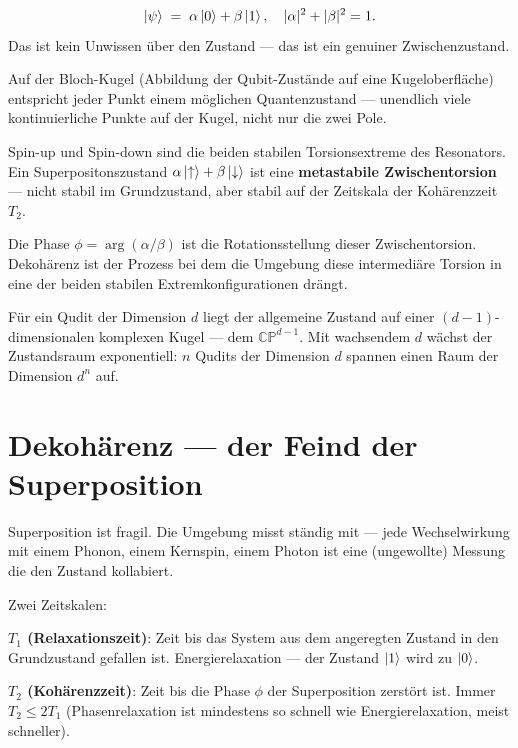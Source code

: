 \begin{equation}
  \left|\psi\right\rangle \;=\; \alpha\left|0\right\rangle + \beta\left|1\right\rangle,
  \quad |\alpha|^2 + |\beta|^2 = 1.
\end{equation}
Das ist kein Unwissen über den Zustand ---
das ist ein genuiner Zwischenzustand.

Auf der Bloch-Kugel (Abbildung der Qubit-Zustände
auf eine Kugeloberfläche) entspricht jeder Punkt
einem möglichen Quantenzustand ---
unendlich viele kontinuierliche Punkte auf der Kugel,
nicht nur die zwei Pole.

\begin{foundation}
Spin-up und Spin-down sind die beiden stabilen
Torsionsextreme des Resonators.
Ein Superpositonszustand $\alpha\left|\uparrow\right\rangle+\beta\left|\downarrow\right\rangle$
ist eine \textbf{metastabile Zwischentorsion} ---
nicht stabil im Grundzustand, aber stabil auf
der Zeitskala der Kohärenzzeit $T_2$.

Die Phase $\phi = \arg(\alpha/\beta)$ ist die
Rotationsstellung dieser Zwischentorsion.
Dekohärenz ist der Prozess bei dem die Umgebung
diese intermediäre Torsion in eine der beiden
stabilen Extremkonfigurationen drängt.
\end{foundation}

Für ein Qudit der Dimension $d$ liegt der
allgemeine Zustand auf einer $(d-1)$-dimensionalen
komplexen Kugel --- dem \textbf{$\mathbb{CP}^{d-1}$}.
Mit wachsendem $d$ wächst der Zustandsraum
exponentiell: $n$ Qudits der Dimension $d$
spannen einen Raum der Dimension $d^n$ auf.

\section{Dekohärenz --- der Feind der Superposition}
\label{sec:dekohärenz}

Superposition ist fragil. Die Umgebung misst ständig
mit --- jede Wechselwirkung mit einem Phonon,
einem Kernspin, einem Photon ist eine
(ungewollte) Messung die den Zustand kollabiert.

Zwei Zeitskalen:

\textbf{$T_1$ (Relaxationszeit)}: Zeit bis das System
aus dem angeregten Zustand in den Grundzustand gefallen ist.
Energierelaxation --- der Zustand $\left|1\right\rangle$ wird zu $\left|0\right\rangle$.

\textbf{$T_2$ (Kohärenzzeit)}: Zeit bis die Phase $\phi$
der Superposition zerstört ist.
Immer $T_2 \leq 2T_1$ (Phasenrelaxation ist mindestens
so schnell wie Energierelaxation, meist schneller).

